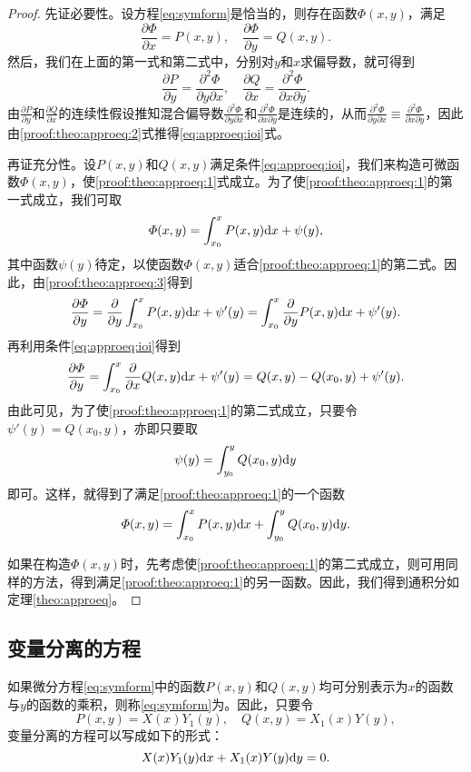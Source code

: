 \begin{proof}
先证必要性。设方程\eqref{eq:symform}是恰当的，则存在函数$\varPhi(x,y)$，满足
\begin{equation}\label{proof:theo:approeq:1}
\frac{\partial\varPhi}{\partial x}=P(x,y),\quad\frac{\partial\varPhi}{\partial y}=Q(x,y).
\end{equation}
然后，我们在上面的第一式和第二式中，分别对$y$和$x$求偏导数，就可得到
\begin{equation}\label{proof:theo:approeq:2}
\frac{\partial P}{\partial y}=\frac{\partial^2\varPhi}{\partial y\partial x},\quad\frac{\partial Q}{\partial x}=\frac{\partial^2\varPhi}{\partial x\partial y}.
\end{equation}
由$\frac{\partial P}{\partial y}$和$\frac{\partial Q}{\partial x}$的连续性假设推知混合偏导数$\frac{\partial^2\varPhi}{\partial y\partial x}$和$\frac{\partial^2\varPhi}{\partial x\partial y}$是连续的，从而$\frac{\partial^2\varPhi}{\partial y\partial x}\equiv\frac{\partial^2\varPhi}{\partial x\partial y}$，因此由\eqref{proof:theo:approeq:2}式推得\eqref{eq:approeq:ioi}式。

再证充分性。设$P(x,y)$和$Q(x,y)$满足条件\eqref{eq:approeq:ioi}，我们来构造可微函数$\varPhi(x,y)$，使\eqref{proof:theo:approeq:1}式成立。为了使\eqref{proof:theo:approeq:1}的第一式成立，我们可取
\begin{equation}\label{proof:theo:approeq:3}
\varPhi(x,y)=\int_{x_0}^{x}P(x,y)\mathrm{d} x+\psi(y),
\end{equation}
其中函数$\psi(y)$待定，以使函数$\varPhi(x,y)$适合\eqref{proof:theo:approeq:1}的第二式。因此，由\eqref{proof:theo:approeq:3}得到
\[
\frac{\partial{}\varPhi}{\partial{}y}=\frac{\partial{}}{\partial{}y}\int_{x_0}^{x}P(x,y)\mathrm{d} x+\psi'(y)=\int_{x_0}^x\frac{\partial{}}{\partial{}y}P(x,y)\mathrm{d} x+\psi'(y).
\]
再利用条件\eqref{eq:approeq:ioi}得到
\[
\frac{\partial{}\varPhi}{\partial{}y}=\int_{x_0}^x\frac{\partial{}}{\partial{}x}Q(x,y)\mathrm{d} x+\psi'(y)=Q(x,y)-Q(x_0,y)+\psi'(y).
\]
由此可见，为了使\eqref{proof:theo:approeq:1}的第二式成立，只要令$\psi'(y)=Q(x_0,y)$，亦即只要取\[
\psi(y)=\int_{y_0}^yQ(x_0,y)\mathrm{d} y
\]即可。这样，就得到了满足\eqref{proof:theo:approeq:1}的一个函数\[
\varPhi(x,y)=\int_{x_0}^xP(x,y)\mathrm{d} x+\int_{y_0}^yQ(x_0,y)\mathrm{d} y.
\]

如果在构造$\varPhi(x,y)$时，先考虑使\eqref{proof:theo:approeq:1}的第二式成立，则可用同样的方法，得到满足\eqref{proof:theo:approeq:1}的另一函数。因此，我们得到通积分如定理\ref{theo:approeq}。
\end{proof}

\subsection{变量分离的方程}
如果微分方程\eqref{eq:symform}中的函数$P(x,y)$和$Q(x,y)$均可分别表示为$x$的函数与$y$的函数的乘积，则称\eqref{eq:symform}为。因此，只要令\[
P(x,y)=X(x)Y_1(y),\quad Q(x,y)=X_1(x)Y(y),
\]变量分离的方程可以写成如下的形式：
\begin{equation}\label{eq:varsep}
X(x)Y_1(y)\mathrm{d} x+X_1(x)Y(y)\mathrm{d} y=0.
\end{equation}

